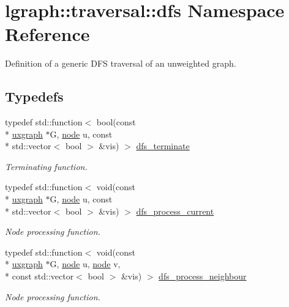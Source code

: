 \hypertarget{namespacelgraph_1_1traversal_1_1dfs}{\section{lgraph\-:\-:traversal\-:\-:dfs Namespace Reference}
\label{namespacelgraph_1_1traversal_1_1dfs}
}


Definition of a generic D\-F\-S traversal of an unweighted graph.  


\subsection*{Typedefs}
\begin{DoxyCompactItemize}
\item 
typedef std\-::function$<$ bool(const \\*
\hyperlink{classlgraph_1_1uxgraph}{uxgraph} $\ast$G, \hyperlink{namespacelgraph_a397169dd66adf725210a30fb7251773e}{node} u, const \\*
std\-::vector$<$ bool $>$ \&vis) $>$ \hyperlink{namespacelgraph_1_1traversal_1_1dfs_addcc00649966bb285b85c134c78c44b5}{dfs\-\_\-terminate}
\begin{DoxyCompactList}\small\item\em Terminating function. \end{DoxyCompactList}\item 
typedef std\-::function$<$ void(const \\*
\hyperlink{classlgraph_1_1uxgraph}{uxgraph} $\ast$G, \hyperlink{namespacelgraph_a397169dd66adf725210a30fb7251773e}{node} u, const \\*
std\-::vector$<$ bool $>$ \&vis) $>$ \hyperlink{namespacelgraph_1_1traversal_1_1dfs_a9bee9010c5bda8980b868d1241c0097a}{dfs\-\_\-process\-\_\-current}
\begin{DoxyCompactList}\small\item\em Node processing function. \end{DoxyCompactList}\item 
typedef std\-::function$<$ void(const \\*
\hyperlink{classlgraph_1_1uxgraph}{uxgraph} $\ast$G, \hyperlink{namespacelgraph_a397169dd66adf725210a30fb7251773e}{node} u, \hyperlink{namespacelgraph_a397169dd66adf725210a30fb7251773e}{node} v, \\*
const std\-::vector$<$ bool $>$ \&vis) $>$ \hyperlink{namespacelgraph_1_1traversal_1_1dfs_af81a65d0c3b375b2c31d4b7e9d707039}{dfs\-\_\-process\-\_\-neighbour}
\begin{DoxyCompactList}\small\item\em Node processing function. \end{DoxyCompactList}\end{DoxyCompactItemize}
